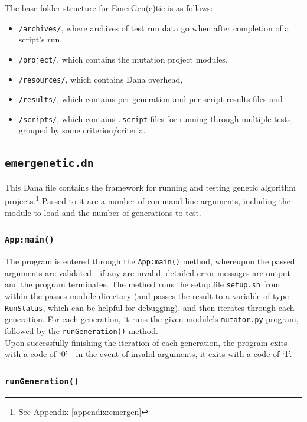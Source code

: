 \documentclass[compsoc,12pt,a4paper]{IEEEtran}
\begin{document}
			The base folder structure for EmerGen(e)tic is as follows:
			\begin{itemize}
				\item \lstinline|/archives/|, where archives of test run data go when after completion of a script's run,
				\item \lstinline|/project/|, which contains the mutation project modules,
				\item \lstinline|/resources/|, which contains Dana overhead,
				\item \lstinline|/results/|, which contains per-generation and per-script results files and
				\item \lstinline|/scripts/|, which contains \lstinline|.script| files for running through multiple tests, grouped by some criterion/criteria.
			\end{itemize}
			
		\subsection{\lstinline|emergenetic.dn|}
		
			This Dana file contains the framework for running and testing genetic algorithm projects.\footnote{See Appendix \ref{appendix:emergen}} Passed to it are a number of command-line arguments, including the module to load and the number of generations to test.
			
			\subsubsection{\lstinline|App:main()|}
			
				The program is entered through the \lstinline|App:main()| method, whereupon the passed arguments are validated---if any are invalid, detailed error messages are output and the program terminates. The method runs the setup file \lstinline|setup.sh| from within the passes module directory (and passes the result to a variable of type \lstinline|RunStatus|, which can be helpful for debugging), and then iterates through each generation. For each generation, it runs the given module's \lstinline|mutator.py| program, followed by the \lstinline|runGeneration()| method.\\
				Upon successfully finishing the iteration of each generation, the program exits with a code of `0'---in the event of invalid arguments, it exits with a code of `1'.
	
			\subsubsection{\lstinline|runGeneration()|}
			
\end{document}
